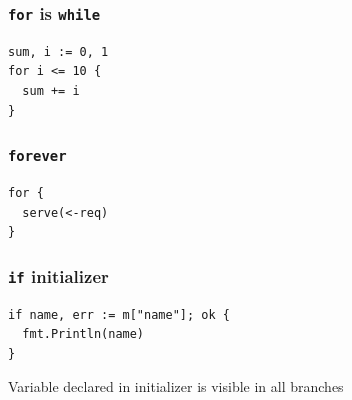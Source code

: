 \documentclass[xetex,mathserif,serif,12pt]{beamer}
\begin{document}
\begin{frame}[fragile]
  \frametitle{\texttt{for} is \texttt{while}}

  \begin{beamer@nomargin}
    \begin{lstlisting}
sum, i := 0, 1
for i <= 10 {
  sum += i
}
    \end{lstlisting}
  \end{beamer@nomargin}
\end{frame}

\begin{frame}[fragile]
  \frametitle{\texttt{forever}}

  \begin{beamer@nomargin}
    \begin{lstlisting}
for {
  serve(<-req)
}
    \end{lstlisting}
  \end{beamer@nomargin}
\end{frame}


\begin{frame}[fragile]
  \frametitle{\texttt{if} initializer}

  \begin{beamer@nomargin}
    \begin{lstlisting}
if name, err := m["name"]; ok {
  fmt.Println(name)
}
    \end{lstlisting}
  \end{beamer@nomargin}

  Variable declared in initializer is visible in all branches
\end{frame}
\end{document}
